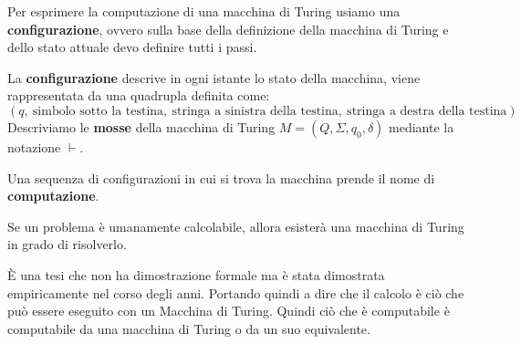 Per esprimere la computazione di una macchina di Turing usiamo una \textbf{configurazione},
ovvero sulla base della definizione della macchina di Turing e dello stato attuale
devo definire tutti i passi.

La \textbf{configurazione} descrive in ogni istante lo stato della macchina,
viene rappresentata da una quadrupla definita come:
\begin{equation}
    (q, \ \text{simbolo sotto la testina}, \ \text{stringa a sinistra della testina}, \ \text{stringa a destra della testina})
\end{equation}
Descriviamo le \textbf{mosse} della macchina di Turing $M = (Q, \Sigma, q_0, \delta)$
mediante la notazione $\vdash$.
\begin{definizione}
    Una sequenza di configurazioni in cui si trova la macchina prende il nome di
    \textbf{computazione}.
\end{definizione}
\begin{teorema}
    Se un problema è umanamente calcolabile, allora esisterà una macchina di
    Turing in grado di risolverlo.
\end{teorema}
È una tesi che non ha dimostrazione formale ma è stata dimostrata empiricamente
nel corso degli anni. Portando quindi a dire che il calcolo è ciò che può essere
eseguito con un Macchina di Turing. Quindi ciò che è computabile è computabile da
una macchina di Turing o da un suo equivalente.


